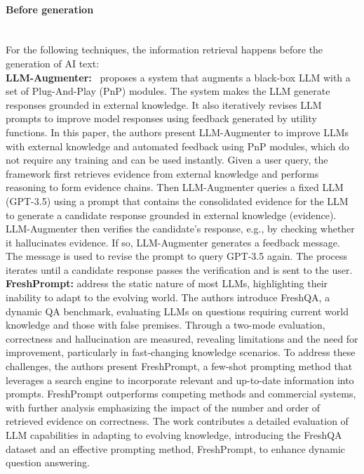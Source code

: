 \documentclass[11pt]{article}
\begin{document}
\paragraph{Before generation} \mbox{} \\
\label{subsubsubsec:Before generation}
For the following techniques, the information retrieval happens before the generation of AI text: \\
\textbf{LLM-Augmenter:}~\cite{peng2023check} proposes a system that augments
a black-box LLM with a set of Plug-And-Play (PnP) \cite{li2023selfchecker} modules. The system makes the LLM generate responses grounded in external knowledge. It
also iteratively revises LLM prompts to improve model responses using feedback generated by utility functions.
In this paper, the authors present LLM-Augmenter to improve LLMs with external knowledge and automated feedback using PnP modules, which do not require any training and can be used instantly. Given a user query, the framework first retrieves evidence from external knowledge and performs reasoning to form evidence chains. Then LLM-Augmenter queries a fixed LLM (GPT-3.5) using a prompt that contains the consolidated evidence for the LLM to generate a candidate response grounded in external knowledge (evidence). LLM-Augmenter then veriﬁes the candidate's response, e.g., by checking whether it
hallucinates evidence. If so, LLM-Augmenter
generates a feedback message. The message is used to revise the prompt to query GPT-3.5 again. The process iterates until a candidate response passes the
veriﬁcation and is sent to the user. \\
\textbf{FreshPrompt:} \cite{vu2023freshllms} address the static nature of most LLMs, highlighting their inability to adapt to the evolving world. The authors introduce FreshQA, a dynamic QA benchmark, evaluating LLMs on questions requiring current world knowledge and those with false premises. Through a two-mode evaluation, correctness and hallucination are measured, revealing limitations and the need for improvement, particularly in fast-changing knowledge scenarios. To address these challenges, the authors present FreshPrompt, a few-shot prompting method that leverages a search engine to incorporate relevant and up-to-date information into prompts. FreshPrompt outperforms competing methods and commercial systems, with further analysis emphasizing the impact of the number and order of retrieved evidence on correctness. The work contributes a detailed evaluation of LLM capabilities in adapting to evolving knowledge, introducing the FreshQA dataset and an effective prompting method, FreshPrompt, to enhance dynamic question answering.
\end{document}
